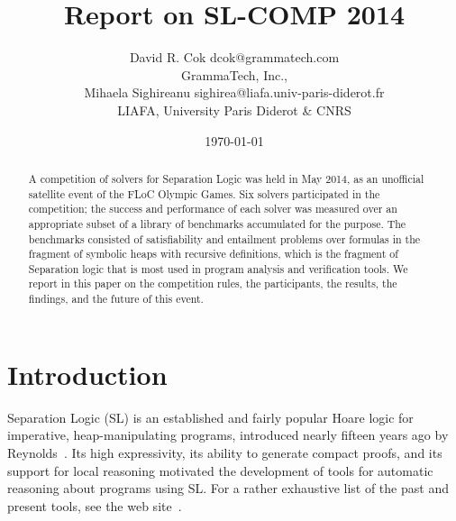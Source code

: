 \documentclass[twoside,11pt]{article}
\title{Report on SL-COMP 2014}
\author{\name David R. Cok \email dcok@grammatech.com \\
        \addr GrammaTech, Inc., \\
        \AND
        \name Mihaela Sighireanu \email sighirea@liafa.univ-paris-diderot.fr \\
         \addr LIAFA, University Paris Diderot \& CNRS}
\date{\today}
\begin{document}
\sloppy
\maketitle


\begin{abstract}
A competition of solvers for Separation Logic 
was held in May 2014, 
as an unofficial satellite event of the FLoC Olympic Games.
Six solvers participated in the competition; the success and performance
of each solver was measured over an appropriate subset of a library of benchmarks
accumulated for the purpose.
The benchmarks consisted of satisfiability and entailment problems
over formulas in the fragment of symbolic heaps with recursive definitions, 
which is the fragment of Separation logic that is most used in program analysis and verification tools.
We report in this paper on 
the competition rules, the participants, the results, the findings, and  
the future of this event.
\end{abstract}






\section{Introduction}

Separation Logic (SL) is an established and fairly popular Hoare logic 
for imperative, heap-manipulating programs, 
introduced nearly fifteen years ago by Reynolds~\cite{Reynolds99,OHearnRY01,Reynolds02}. 
%
Its high expressivity, its ability to generate compact proofs, and 
its support for local reasoning 
motivated the development of tools for automatic reasoning about programs using SL.
For a rather exhaustive list of the past and present tools, see the web site~\cite{OHearn-SLsite}.
\end{document}

